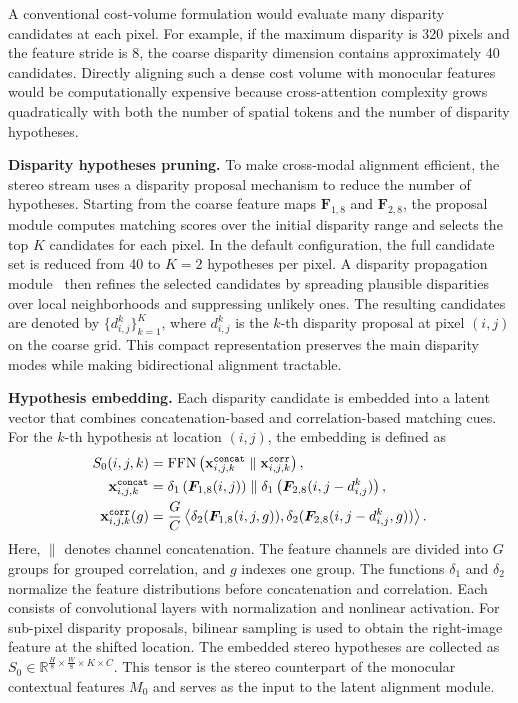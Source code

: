 A conventional cost-volume formulation would evaluate many disparity candidates at each pixel.
For example, if the maximum disparity is 320 pixels and the feature stride is 8, the coarse disparity dimension contains approximately 40 candidates.
Directly aligning such a dense cost volume with monocular features would be computationally expensive because cross-attention complexity grows quadratically with both the number of spatial tokens and the number of disparity hypotheses.

\noindent\textbf{Disparity hypotheses pruning.}
To make cross-modal alignment efficient, the stereo stream uses a disparity proposal mechanism to reduce the number of hypotheses.
Starting from the coarse feature maps $\bm{F}_{1,8}$ and $\bm{F}_{2,8}$, the proposal module computes matching scores over the initial disparity range and selects the top $K$ candidates for each pixel. 
In the default configuration, the full candidate set is reduced from 40 to $K=2$ hypotheses per pixel.
A disparity propagation module~\cite{guan2024neural} then refines the selected candidates by spreading plausible disparities over local neighborhoods and suppressing unlikely ones.
The resulting candidates are denoted by $\{d^k_{i,j}\}_{k=1}^{K}$,
where $d^k_{i,j}$ is the $k$-th disparity proposal at pixel $(i,j)$ on the coarse grid.
This compact representation preserves the main disparity modes while making bidirectional alignment tractable.

\noindent\textbf{Hypothesis embedding.}
Each disparity candidate is embedded into a latent vector that combines concatenation-based and correlation-based matching cues. For the $k$-th hypothesis at location $(i,j)$, the embedding is defined as
\begin{align}
	S_0(i,j,k)&=\text{FFN}\left(\mathbf{x}_{i,j,k}^{{\tt concat}} \parallel \mathbf{x}_{i,j,k}^{{\tt corr}}\right), \nonumber \\
	\mathbf{x}_{i,j,k}^{{\tt concat}}&=\delta_1\left(\bm{F}_{1,8}(i,j)\right) \parallel\delta_1\left(\bm{F}_{2,8}(i,j-d_{i,j}^{k})\right), \label{eq:hypothesis-embedding} \\
	\mathbf{x}_{i,j,k}^{{\tt corr}}(g)&=\frac{G}{C}\left\langle\delta_2(\bm{F}_{1,8}(i,j,g)),\delta_2(\bm{F}_{2,8}(i,j-d_{i,j}^k,g))\right\rangle \nonumber.
\end{align}
Here, $\parallel$ denotes channel concatenation.
The feature channels are divided into $G$ groups for grouped correlation, and $g$ indexes one group.
The functions $\delta_1$ and $\delta_2$ normalize the feature distributions before concatenation and correlation. 
Each consists of convolutional layers with normalization and nonlinear activation. 
For sub-pixel disparity proposals, bilinear sampling is used to obtain the right-image feature at the shifted location.
The embedded stereo hypotheses are collected as
$S_0 \in \mathbb{R}^{\frac{H}{8} \times \frac{W}{8} \times K \times C}$.
This tensor is the stereo counterpart of the monocular contextual features $M_0$ and serves as the input to the latent alignment module.


